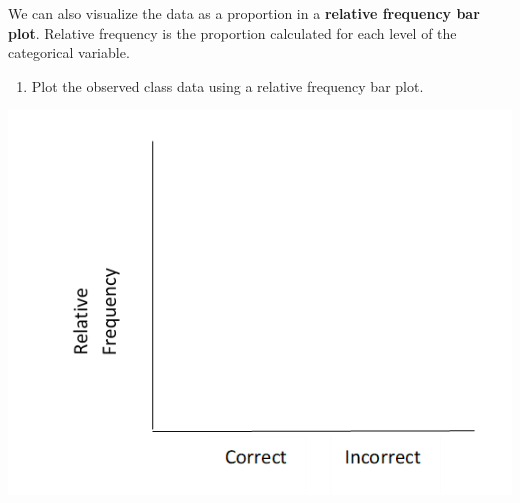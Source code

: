 \documentclass[
]{report}
\providecommand{\tightlist}{%
  \setlength{\itemsep}{0pt}\setlength{\parskip}{0pt}}
\begin{document}
We can also visualize the data as a proportion in a \textbf{relative frequency bar plot}. Relative frequency is the proportion calculated for each level of the categorical variable.

\begin{enumerate}
\def\labelenumi{\arabic{enumi}.}
\setcounter{enumi}{7}
\tightlist
\item
  Plot the observed class data using a relative frequency bar plot.
\end{enumerate}

\begin{flushleft}\includegraphics[width=0.75\linewidth]{images/relative_barplot_martian} \end{flushleft}

\newpage
\end{document}
